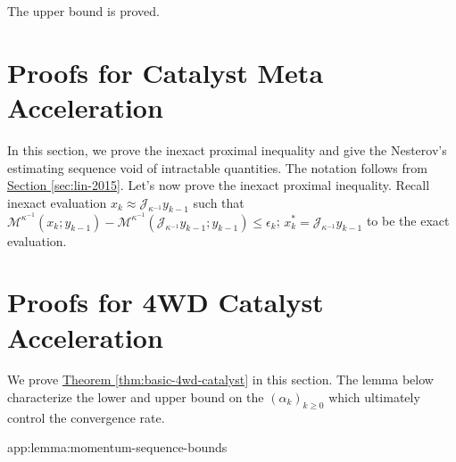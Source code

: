 \documentclass[12pt]{article}
\begin{document}
        The upper bound is proved. 

        
\section{Proofs for Catalyst Meta Acceleration}
    In this section, we prove the inexact proximal inequality and give the Nesterov's estimating sequence void of intractable quantities. 
    The notation follows from 
    \hyperref[sec:lin-2015]{Section \ref*{sec:lin-2015}}. 
    Let's now prove the inexact proximal inequality. 
    Recall inexact evaluation $x_k \approx \mathcal J_{\kappa^{-1}}y_{k - 1}$ such that $\mathcal M^{\kappa^{-1}}(x_k; y_{k - 1}) - \mathcal M^{\kappa^{-1}}(\mathcal J_{\kappa^{-1}}y_{k - 1}; y_{k - 1}) \le \epsilon_k$; $x_k^* = \mathcal J_{\kappa^{-1}}y_{k - 1}$ to be the exact evaluation. 

\section{Proofs for 4WD Catalyst Acceleration}
    We prove
    \hyperref[thm:basic-4wd-catalyst]{Theorem \ref*{thm:basic-4wd-catalyst}}
    in this section. 
    The lemma below characterize the lower and upper bound on the $(\alpha_k)_{k \ge 0}$ which ultimately control the convergence rate. 
    \begin{lemma}{app:lemma:momentum-sequence-bounds}
        
    \end{lemma}
\end{document}
